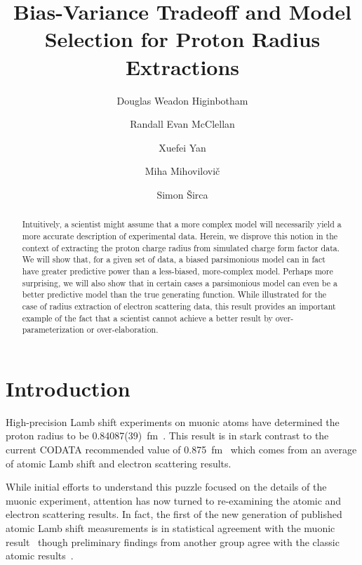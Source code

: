 \documentclass[10pt,aps,prc,twocolumn]{revtex4-1}
\begin{document}
\title{Bias-Variance Tradeoff and Model Selection for Proton Radius Extractions}

\author{Douglas Weadon Higinbotham}
\author{Randall Evan McClellan}
\author{Xuefei Yan}
\author{Miha Mihovilovi\v{c}}
\author{Simon \v{S}irca}

\begin{abstract}
Intuitively, a scientist might assume that a more complex model will necessarily yield a more 
accurate description of experimental data.   Herein, we disprove this notion in the context of extracting 
the proton charge radius from simulated charge form factor data.  We will show that, for a given set of data, 
a biased parsimonious model can in fact have greater predictive power than a less-biased, more-complex model.  
Perhaps more surprising,
we will also show that in certain cases a parsimonious model can even be a better predictive model 
than the true generating function.   While illustrated for the case of radius extraction of electron scattering data,
this result provides an important example of the fact that a scientist cannot achieve a better result by
over-parameterization or over-elaboration.
\end{abstract}

\maketitle

\section{Introduction}

High-precision Lamb shift experiments on muonic atoms have determined the proton radius to 
be 0.84087(39)~fm~\cite{Pohl:2010zza,Antognini:1900ns}.   This result is in stark contrast to the current
CODATA recommended value of 0.875~fm~\cite{Mohr:2015ccw} which comes from an average of atomic 
Lamb shift and electron scattering results.  

While initial efforts to understand this puzzle focused on the details of the muonic experiment, attention has
now turned to re-examining the atomic and electron scattering results.   In fact, the first of the
new generation of published atomic Lamb shift measurements is in statistical agreement with the muonic 
result~\cite{Beyer79} though preliminary findings from another group agree with the classic atomic 
results~\cite{fleurbaey:tel-01633631}.
\end{document}
